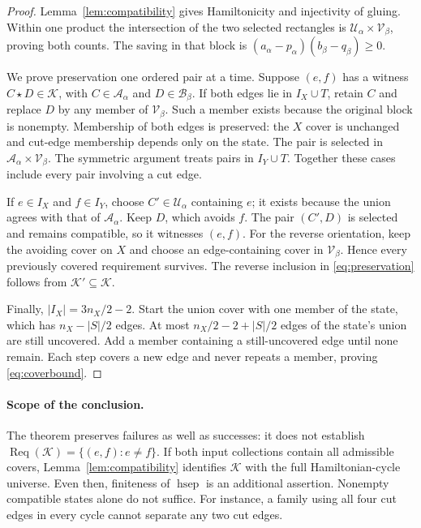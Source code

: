 \documentclass[10pt]{article}
\newcommand{\hsep}{\operatorname{hsep}}
\newcommand{\Req}{\operatorname{Req}}
\begin{document}
\begin{proof}
Lemma~\ref{lem:compatibility} gives Hamiltonicity and injectivity of gluing.
Within one product the intersection of the two selected rectangles is
$\mathcal U_\alpha\times\mathcal V_\beta$, proving both counts. The saving
in that block is $(a_\alpha-p_\alpha)(b_\beta-q_\beta)\ge0$.

We prove preservation one ordered pair at a time. Suppose $(e,f)$ has a
witness $C\star D\in\mathcal K$, with $C\in\mathcal A_\alpha$ and
$D\in\mathcal B_\beta$.
If both edges lie in $I_X\cup T$, retain $C$ and replace $D$ by any member
of $\mathcal V_\beta$. Such a member exists because the original block
is nonempty. Membership of both edges is preserved: the $X$ cover is
unchanged and cut-edge membership depends only on the state. The pair is
selected in $\mathcal A_\alpha\times\mathcal V_\beta$.
The symmetric argument treats pairs in $I_Y\cup T$. Together these cases
include every pair involving a cut edge.

If $e\in I_X$ and $f\in I_Y$, choose $C'\in\mathcal U_\alpha$ containing
$e$; it exists because the union agrees with that of $\mathcal A_\alpha$.
Keep $D$, which avoids $f$. The pair $(C',D)$ is selected and remains
compatible, so it witnesses $(e,f)$. For the reverse orientation, keep
the avoiding cover on $X$ and choose an edge-containing cover in
$\mathcal V_\beta$. Hence every previously covered requirement survives.
The reverse inclusion in \eqref{eq:preservation} follows from
$\mathcal K'\subseteq\mathcal K$.

Finally, $|I_X|=3n_X/2-2$. Start the union cover with one member of the
state, which has $n_X-|S|/2$ edges. At most
$n_X/2-2+|S|/2$ edges of the state's union are still uncovered. Add a member
containing a still-uncovered edge until none remain. Each step covers a new
edge and never repeats a member, proving \eqref{eq:coverbound}.
\end{proof}

\paragraph{Scope of the conclusion.}
The theorem preserves failures as well as successes: it does not establish
$\Req(\mathcal K)=\{(e,f):e\ne f\}$. If both input collections contain all
admissible covers, Lemma~\ref{lem:compatibility} identifies $\mathcal K$ with
the full Hamiltonian-cycle universe. Even then, finiteness of $\hsep$ is an
additional assertion. Nonempty compatible states alone do not suffice.
For instance, a family using all four cut edges in every cycle cannot
separate any two cut edges.
\end{document}
